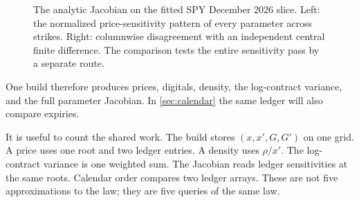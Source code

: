 \begin{figure}[htbp]
\centering
{}
\caption{The analytic Jacobian on the fitted SPY December 2026 slice.  Left:
the normalized price-sensitivity pattern of every parameter across strikes.
Right: columnwise disagreement with an independent central finite difference.
The comparison tests the entire sensitivity pass by a separate route.}
\label{fig:jacobian}
\end{figure}

One build therefore produces prices, digitals, density, the log-contract
variance, and the full parameter Jacobian.  In \cref{sec:calendar} the same
ledger will also compare expiries.

It is useful to count the shared work.  The build stores $(x,x',G,G')$ on one
grid.  A price uses one root and two ledger entries.  A density uses
$\rho/x'$.  The log-contract variance is one weighted sum.  The Jacobian
reads ledger sensitivities at the same roots.  Calendar order compares two
ledger arrays.  These are not five approximations to the law; they are five
queries of the same law.

